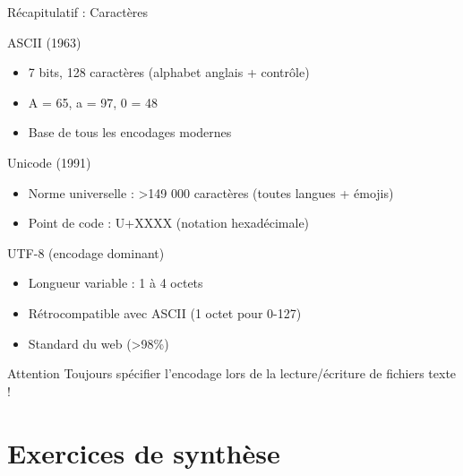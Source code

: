 \documentclass[aspectratio=1610]{beamer}
\begin{document}
\begin{frame}[allowframebreaks]{ Récapitulatif : Caractères}

  \begin{block}{ASCII (1963)}
    \begin{itemize}
      \item 7 bits, 128 caractères (alphabet anglais + contrôle)
      \item A = 65, a = 97, 0 = 48
      \item Base de tous les encodages modernes
    \end{itemize}
  \end{block}

  \begin{block}{Unicode (1991)}
    \begin{itemize}
      \item Norme universelle : >149 000 caractères (toutes langues + émojis)
      \item Point de code : U+XXXX (notation hexadécimale)
    \end{itemize}
  \end{block}

  \framebreak

  \begin{block}{UTF-8 (encodage dominant)}
    \begin{itemize}
      \item Longueur variable : 1 à 4 octets
      \item Rétrocompatible avec ASCII (1 octet pour 0-127)
      \item Standard du web (>98\%)
    \end{itemize}
  \end{block}

  \begin{alertblock}{ Attention}
    Toujours spécifier l'encodage lors de la lecture/écriture de fichiers texte !
  \end{alertblock}

\end{frame}

\section{Exercices de synthèse}
\end{document}
